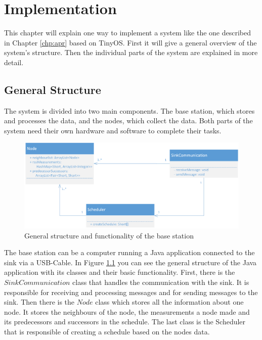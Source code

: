 \chapter{Implementation}
\label{chp:imp}
This chapter will explain one way to implement a system  like the one described in Chapter \ref{chp:apr} based on TinyOS. First it will give a general overview of the system's structure. Then the individual parts of the system are explained in more detail.    

\section{General Structure}
\label{chp:imp_general}
The system is divided into two main components. The base station, which stores and processes the data, and the nodes, which collect the data. Both parts of the system need their own hardware and software to complete their tasks.  

\begin{figure}[htbp]
	\centering
    \includegraphics[scale=0.7]{content/images/BaseStation/Klassendiagram}
   	\caption{General structure and functionality of the base station}
    \label{fig:bsKlassen}
\end{figure}

The base station can be a computer running a Java application connected to the sink via a USB-Cable. In Figure \ref{fig:bsKlassen} you can see the general structure of the Java application with its classes and their basic functionality. First, there is the $SinkCommunication$ class that handles the communication with the sink. It is responsible for receiving and processing messages and for sending messages to the sink. Then there is the $Node$ class which stores all the information about one node. It stores the neighbours of the node, the measurements a node made and its predecessors and successors in the schedule. The last class is the Scheduler that is responsible of creating a schedule based on the nodes data.  


